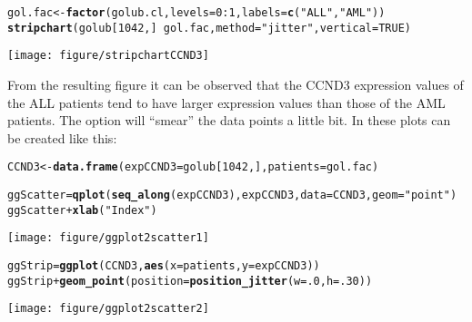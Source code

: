 \documentclass{article}\usepackage[]{graphicx}\usepackage[usenames,dvipsnames]{color}
\makeatletter
\def\maxwidth{ %
  \ifdim\Gin@nat@width>\linewidth
    \linewidth
  \else
    \Gin@nat@width
  \fi
}
\newcommand{\hlnum}[1]{\textcolor[rgb]{0.686,0.059,0.569}{#1}}%
\newcommand{\hlstr}[1]{\textcolor[rgb]{0.192,0.494,0.8}{#1}}%
\newcommand{\hlopt}[1]{\textcolor[rgb]{0,0,0}{#1}}%
\newcommand{\hlstd}[1]{\textcolor[rgb]{0.345,0.345,0.345}{#1}}%
\newcommand{\hlkwb}[1]{\textcolor[rgb]{0.69,0.353,0.396}{#1}}%
\newcommand{\hlkwc}[1]{\textcolor[rgb]{0.333,0.667,0.333}{#1}}%
\newcommand{\hlkwd}[1]{\textcolor[rgb]{0.737,0.353,0.396}{\textbf{#1}}}%
\newenvironment{kframe}{%
 \def\at@end@of@kframe{}%
 \ifinner\ifhmode%
  \def\at@end@of@kframe{\end{minipage}}%
  \begin{minipage}{\columnwidth}%
 \fi\fi%
 \def\FrameCommand##1{\hskip\@totalleftmargin \hskip-\fboxsep
 \colorbox{shadecolor}{##1}\hskip-\fboxsep
     \hskip-\linewidth \hskip-\@totalleftmargin \hskip\columnwidth}%
 \MakeFramed {\advance\hsize-\width
   \@totalleftmargin\z@ \linewidth\hsize
   \@setminipage}}%
 {\par\unskip\endMakeFramed%
 \at@end@of@kframe}
\newenvironment{knitrout}{}{} %
\makeatother
\begin{document}
\begin{knitrout}
\color{fgcolor}\begin{kframe}
\begin{alltt}
\hlstd{gol.fac} \hlkwb{<-} \hlkwd{factor}\hlstd{(golub.cl,}\hlkwc{levels}\hlstd{=}\hlnum{0}\hlopt{:}\hlnum{1}\hlstd{,} \hlkwc{labels}\hlstd{=} \hlkwd{c}\hlstd{(}\hlstr{"ALL"}\hlstd{,}\hlstr{"AML"}\hlstd{))}
\hlkwd{stripchart}\hlstd{(golub[}\hlnum{1042}\hlstd{,]} \hlopt{~} \hlstd{gol.fac,} \hlkwc{method}\hlstd{=}\hlstr{"jitter"}\hlstd{,} \hlkwc{vertical} \hlstd{=} \hlnum{TRUE}\hlstd{)}
\end{alltt}
\end{kframe}
\texttt{[image: figure/stripchartCCND3]} 

\end{knitrout}

From the resulting figure it can be observed that the CCND3
expression values of the ALL patients tend to have larger expression values
than those of the AML patients. The option  will ``smear''
the data points a little bit. In  these plots can be created
like this:

\begin{knitrout}
\color{fgcolor}\begin{kframe}
\begin{alltt}
\hlstd{CCND3} \hlkwb{<-} \hlkwd{data.frame}\hlstd{(}\hlkwc{expCCND3} \hlstd{= golub[}\hlnum{1042}\hlstd{,],} \hlkwc{patients} \hlstd{= gol.fac)}

\hlstd{ggScatter} \hlkwb{=} \hlkwd{qplot}\hlstd{(}\hlkwd{seq_along}\hlstd{(expCCND3), expCCND3,} \hlkwc{data} \hlstd{= CCND3,} \hlkwc{geom} \hlstd{=}\hlstr{"point"}\hlstd{)}
\hlstd{ggScatter} \hlopt{+} \hlkwd{xlab}\hlstd{(}\hlstr{"Index"}\hlstd{)}
\end{alltt}
\end{kframe}
\texttt{[image: figure/ggplot2scatter1]} 
\begin{kframe}\begin{alltt}
\hlstd{ggStrip} \hlkwb{=}  \hlkwd{ggplot}\hlstd{(CCND3,} \hlkwd{aes}\hlstd{(}\hlkwc{x}\hlstd{=patients,} \hlkwc{y}\hlstd{=expCCND3))}
\hlstd{ggStrip} \hlopt{+} \hlkwd{geom_point}\hlstd{(}\hlkwc{position} \hlstd{=}  \hlkwd{position_jitter}\hlstd{(}\hlkwc{w} \hlstd{=} \hlnum{.0}\hlstd{,} \hlkwc{h} \hlstd{=} \hlnum{.30}\hlstd{))}
\end{alltt}
\end{kframe}
\texttt{[image: figure/ggplot2scatter2]} 

\end{knitrout}
\end{document}
